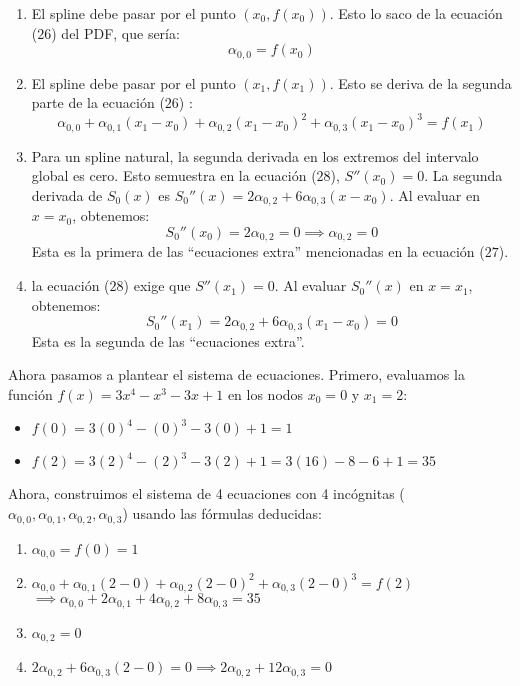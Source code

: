 \documentclass{article}
\begin{document}
\begin{enumerate}
    \item El spline debe pasar por el punto \((x_0, f(x_0))\). Esto lo saco de la ecuación ($26$) del PDF, que sería:
    $$ \alpha_{0,0} = f(x_0) $$

    \item El spline debe pasar por el punto \((x_1, f(x_1))\). Esto se deriva de la segunda parte de la ecuación ($26$) :
    $$ \alpha_{0,0} + \alpha_{0,1}(x_1-x_0) + \alpha_{0,2}(x_1-x_0)^2 + \alpha_{0,3}(x_1-x_0)^3 = f(x_1) $$

    \item Para un spline natural, la segunda derivada en los extremos del intervalo global es cero. Esto semuestra en la ecuación ($28$), \(S''(x_0) = 0\). La segunda derivada de \(S_0(x)\) es \(S_0''(x) = 2\alpha_{0,2} + 6\alpha_{0,3}(x-x_0)\). Al evaluar en \(x=x_0\), obtenemos:
    $$ S_0''(x_0) = 2\alpha_{0,2} = 0 \implies \alpha_{0,2} = 0 $$
    Esta es la primera de las ``ecuaciones extra'' mencionadas en la ecuación ($27$).

    \item la ecuación ($28$) exige que \(S''(x_1) = 0\). Al evaluar \(S_0''(x)\) en \(x=x_1\), obtenemos:
    $$ S_0''(x_1) = 2\alpha_{0,2} + 6\alpha_{0,3}(x_1-x_0) = 0 $$
    Esta es la segunda de las ``ecuaciones extra''.
\end{enumerate}


Ahora pasamos a plantear el sistema de ecuaciones.
Primero, evaluamos la función \(f(x) = 3x^4 - x^3 - 3x + 1\) en los nodos \(x_0=0\) y \(x_1=2\):
\begin{itemize}
    \item \(f(0) = 3(0)^4 - (0)^3 - 3(0) + 1 = 1\)
    \item \(f(2) = 3(2)^4 - (2)^3 - 3(2) + 1 = 3(16) - 8 - 6 + 1 = 35\)
\end{itemize}

Ahora, construimos el sistema de 4 ecuaciones con 4 incógnitas (\(\alpha_{0,0}, \alpha_{0,1}, \alpha_{0,2}, \alpha_{0,3}\)) usando las fórmulas deducidas:
\begin{enumerate}
    \item \(\alpha_{0,0} = f(0) = 1\)
    \item \(\alpha_{0,0} + \alpha_{0,1}(2-0) + \alpha_{0,2}(2-0)^2 + \alpha_{0,3}(2-0)^3 = f(2)\) \\
    \(\implies \alpha_{0,0} + 2\alpha_{0,1} + 4\alpha_{0,2} + 8\alpha_{0,3} = 35\)
    \item \(\alpha_{0,2} = 0 \)
    \item \(2\alpha_{0,2} + 6\alpha_{0,3}(2-0) = 0 \implies 2\alpha_{0,2} + 12\alpha_{0,3} = 0\)
\end{enumerate}
\end{document}
